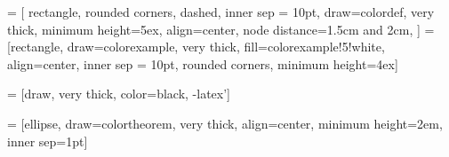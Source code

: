 \newcommand{\source}[1]{
\marginnote[0cm]{\textsc{\textbf{Source --}} #1}
}


\renewcommand\nomgroup[1]{%
  \item[\bfseries
  \ifstrequal{#1}{A}{Analyse}{%
  \ifstrequal{#1}{B}{Algèbre}{%
  \ifstrequal{#1}{C}{Probabilités}{}}}%
]}

\newcommand{\makeboxlabel}[1]{\fbox{#1}\hfill}%
\newenvironment{boxlabel}
  {\begin{list}
    {\arabic{boxlblcounter}}
    {\usecounter{boxlblcounter}
     \setlength{\labelwidth}{3em}
     \setlength{\labelsep}{0em}
     \setlength{\itemsep}{2pt}
     \setlength{\leftmargin}{1.5cm}
     \setlength{\rightmargin}{2cm}
     \setlength{\itemindent}{0em} 
     \let\makelabel=\makeboxlabel
    }
  }
{\end{list}}

 = [
  rectangle, rounded corners, dashed,
  inner sep = 10pt,
  draw=colordef, very thick,
  minimum height=5ex,
  align=center,
  node distance=1.5cm and 2cm,
  ]
   =
  [rectangle,
  draw=colorexample, very thick,
  fill=colorexample!5!white,
  align=center,
  inner sep = 10pt,
  rounded corners, 
  minimum height=4ex]
  
 = [draw, very thick, color=black, -latex']

 =
  [ellipse, draw=colortheorem,
  very thick,
  align=center,
  minimum height=2em, inner sep=1pt]

% 


  


\def\tick#1#2{\draw (#1) ++ (#2:0.125) --++ (#2-180:0.25)} %